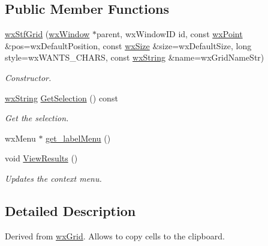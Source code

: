 \subsection*{Public Member Functions}
\begin{DoxyCompactItemize}
\item 
\hyperlink{classwxStfGrid_a469183f48d70d8d6bd07d7da44c20521}{wxStfGrid} (\hyperlink{classwxWindow}{wxWindow} $\ast$parent, wxWindowID id, const \hyperlink{classwxPoint}{wxPoint} \&pos=wxDefaultPosition, const \hyperlink{classwxSize}{wxSize} \&size=wxDefaultSize, long style=wxWANTS\_\-CHARS, const \hyperlink{classwxString}{wxString} \&name=wxGridNameStr)
\begin{DoxyCompactList}\small\item\em Constructor. \item\end{DoxyCompactList}\item 
\hyperlink{classwxString}{wxString} \hyperlink{classwxStfGrid_a0ad171ef7c2f3a1fbc8f708edb01494f}{GetSelection} () const 
\begin{DoxyCompactList}\small\item\em Get the selection. \item\end{DoxyCompactList}\item 
wxMenu $\ast$ \hyperlink{classwxStfGrid_afb599416fa180751b1c5d1926419c0d7}{get\_\-labelMenu} ()
\item 
\hypertarget{classwxStfGrid_ac4b9bb5f6e5609fcaf96a5bf805c2b11}{
void \hyperlink{classwxStfGrid_ac4b9bb5f6e5609fcaf96a5bf805c2b11}{ViewResults} ()}
\label{classwxStfGrid_ac4b9bb5f6e5609fcaf96a5bf805c2b11}

\begin{DoxyCompactList}\small\item\em Updates the context menu. \item\end{DoxyCompactList}\end{DoxyCompactItemize}


\subsection{Detailed Description}
Derived from \hyperlink{classwxGrid}{wxGrid}. Allows to copy cells to the clipboard. 

